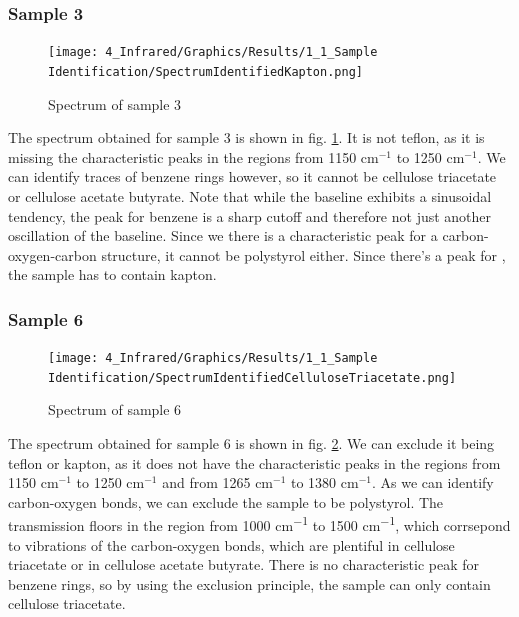 \documentclass[12pt]{article}
\begin{document}
\subsubsection{Sample 3}
\begin{figure}
    \centering
    \texttt{[image: 4\_Infrared/Graphics/Results/1\_1\_Sample Identification/SpectrumIdentifiedKapton.png]}
    \caption{Spectrum of sample 3}
    \label{fig:SpectrumIdentifiedCelluloseAcetateButyrate}
\end{figure}
The spectrum obtained for sample 3 is shown in fig. \ref{fig:SpectrumIdentifiedCelluloseAcetateButyrate}. It is not teflon, as it is missing the characteristic peaks in the regions from 1150 cm$^{-1}$ to 1250 cm$^{-1}$. We can identify traces of benzene rings however, so it cannot be cellulose triacetate or cellulose acetate butyrate. Note that while the baseline exhibits a sinusoidal tendency, the peak for benzene is a sharp cutoff and therefore not just another oscillation of the baseline. Since we there is a characteristic peak for a carbon-oxygen-carbon structure, it cannot be polystyrol either. Since there's a peak for , the sample has to contain kapton.

\newpage
\subsubsection{Sample 6}
\begin{figure}
    \centering
    \texttt{[image: 4\_Infrared/Graphics/Results/1\_1\_Sample Identification/SpectrumIdentifiedCelluloseTriacetate.png]}
    \caption{Spectrum of sample 6}
    \label{fig:SpectrumIdentifiedCelluloseTriacetate}
\end{figure}
The spectrum obtained for sample 6 is shown in fig. \ref{fig:SpectrumIdentifiedCelluloseTriacetate}. We can exclude it being teflon or kapton, as it does not have the characteristic peaks in the regions from 1150 cm$^{-1}$ to 1250 cm$^{-1}$ and from 1265 cm$^{-1}$ to 1380 cm$^{-1}$. As we can identify carbon-oxygen bonds, we can exclude the sample to be polystyrol. The transmission floors in the region from 1000 \si{cm^{-1}} to 1500 \si{cm^{-1}}, which corrsepond to vibrations of the carbon-oxygen bonds, which are plentiful in cellulose triacetate or in cellulose acetate butyrate. There is no characteristic peak for benzene rings, so by using the exclusion principle, the sample can only contain cellulose triacetate. 
\end{document}
